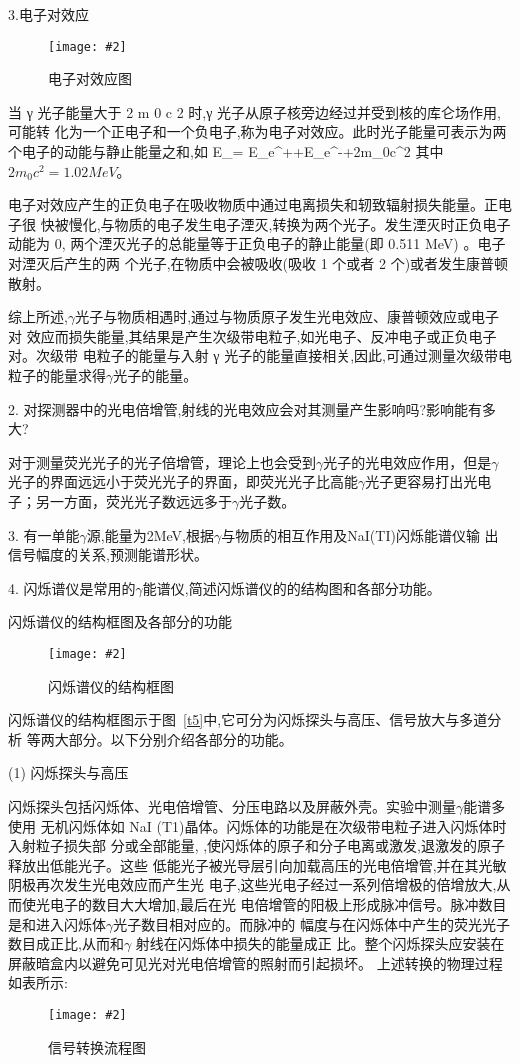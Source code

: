 \documentclass[11pt,a4paper]{ctexart}
\newcommand{\cpic}[2]{
\begin{center}
\texttt{[image: \#2]}
\end{center}
}
\newcommand{\cpicn}[3]
{
\begin{figure}[H]
\cpic{#1}{#2}
\caption{\color{red}#3\label{#2}}
\end{figure}
}
\begin{document}
3.电子对效应
\cpicn{0.4}{t3.png}{电子对效应图}
当 γ 光子能量大于 2 m 0 c 2 时,γ 光子从原子核旁边经过并受到核的库仑场作用,可能转
化为一个正电子和一个负电子,称为电子对效应。此时光子能量可表示为两个电子的动能与静止能量之和,如
\beq
E_\gamma = E_e^{+}+E_e^{-}+2m_0c^2
\eeq
其中$2m_0c^2 = 1.02MeV$。

电子对效应产生的正负电子在吸收物质中通过电离损失和轫致辐射损失能量。正电子很
快被慢化,与物质的电子发生电子湮灭,转换为两个光子。发生湮灭时正负电子动能为 0,
两个湮灭光子的总能量等于正负电子的静止能量(即 0.511 MeV)
。电子对湮灭后产生的两
个光子,在物质中会被吸收(吸收 1 个或者 2 个)或者发生康普顿散射。

综上所述,$\gamma$光子与物质相遇时,通过与物质原子发生光电效应、康普顿效应或电子对
效应而损失能量,其结果是产生次级带电粒子,如光电子、反冲电子或正负电子对。次级带
电粒子的能量与入射 γ 光子的能量直接相关,因此,可通过测量次级带电粒子的能量求得$\gamma$光子的能量。

2. 对探测器中的光电倍增管,射线的光电效应会对其测量产生影响吗?影响能有多大?

对于测量荧光光子的光子倍增管，理论上也会受到$\gamma$光子的光电效应作用，但是$\gamma$光子的界面远远小于荧光光子的界面，即荧光光子比高能$\gamma$光子更容易打出光电子；另一方面，荧光光子数远远多于$\gamma$光子数。

3. 有一单能$\gamma$源,能量为2MeV,根据$\gamma$与物质的相互作用及NaI(TI)闪烁能谱仪输
出信号幅度的关系,预测能谱形状。


4. 闪烁谱仪是常用的$\gamma$能谱仪,简述闪烁谱仪的的结构图和各部分功能。

闪烁谱仪的结构框图及各部分的功能
\cpicn{0.4}{t5.png}{闪烁谱仪的结构框图}
闪烁谱仪的结构框图示于图~\ref{t5}中,它可分为闪烁探头与高压、信号放大与多道分析
等两大部分。以下分别介绍各部分的功能。

(1) 闪烁探头与高压

闪烁探头包括闪烁体、光电倍增管、分压电路以及屏蔽外壳。实验中测量$\gamma$能谱多使用
无机闪烁体如 NaI (T1)晶体。闪烁体的功能是在次级带电粒子进入闪烁体时入射粒子损失部
分或全部能量,
,使闪烁体的原子和分子电离或激发,退激发的原子释放出低能光子。这些
低能光子被光导层引向加载高压的光电倍增管,并在其光敏阴极再次发生光电效应而产生光
电子,这些光电子经过一系列倍增极的倍增放大,从而使光电子的数目大大增加,最后在光
电倍增管的阳极上形成脉冲信号。脉冲数目是和进入闪烁体$\gamma$光子数目相对应的。而脉冲的
幅度与在闪烁体中产生的荧光光子数目成正比,从而和$\gamma$ 射线在闪烁体中损失的能量成正
比。整个闪烁探头应安装在屏蔽暗盒内以避免可见光对光电倍增管的照射而引起损坏。
上述转换的物理过程如表所示:
\cpicn{0.6}{t6.png}{信号转换流程图}
\end{document}
